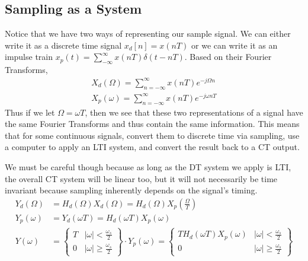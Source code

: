 \documentclass{article}
\begin{document}
\subsection{Sampling as a System}
Notice that we have two ways of representing our sample signal. We can either write it as a discrete time signal $x_d[n] = x(nT)$
or we can write it as an impulse train $x_p(t)=\sum_{-\infty}^{\infty}{x(nT)\delta(t-nT)}$.
Based on their Fourier Transforms, 
\begin{align*}
    X_d(\Omega)=\sum_{n=-\infty}^{\infty}{x(nT)e^{-j\Omega n}}\\
    X_p(\omega)=\sum_{n=-\infty}^{\infty}{x(nT)e^{-j\omega nT}}
\end{align*}
Thus if we let $\Omega=\omega T$, then we see that these two representations of a signal have the same Fourier Transforms
and thus contain the same information. This means that for some continuous signals, convert them to discrete time via sampling,
use a computer to apply an LTI system, and convert the result back to a CT output. 
\begin{figure}[H]
    \centering
\end{figure}
We must be careful though because
as long as the DT system we apply is LTI, the overall CT system will be linear too, but it will not necessarily be time invariant
because sampling inherently depends on the signal's timing.
\begin{align*}
    Y_d(\Omega) &= H_d(\Omega)X_d(\Omega) = H_d(\Omega)X_p\left(\frac{\Omega}{T}\right)\\
    Y_p(\omega) &= Y_d(\omega T) = H_d(\omega T)X_p(\omega)\\
    Y(\omega) &= \left\{
        \begin{array}{cc}
            T & |\omega| < \frac{\omega_s}{2}\\
            0 & |\omega| \ge \frac{\omega_s}{2}
        \end{array}
        \right\} \cdot Y_p(\omega) = \left\{
            \begin{array}{cc}
                TH_d(\omega T)X_p(\omega) & |\omega| < \frac{\omega_s}{2}\\
                0 & |\omega| \ge \frac{\omega_s}{2}
            \end{array}
            \right\}
\end{align*}
\end{document}
